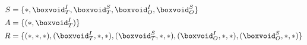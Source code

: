 \documentclass[preview]{standalone}
\begin{document}
\begin{align*}
S &= \{*, \boxvoid^I_T, \boxvoid^S_T, \boxvoid^I_O, \boxvoid^S_O\} \\
A &= \{(*, \boxvoid^I_T)\} \\
R &= \{(*,*,*), (\boxvoid^I_T,*,*), (\boxvoid^S_T,*,*), (\boxvoid^I_O,*,*), (\boxvoid^S_O,*,*)\} \\
\end{align*}
\end{document}
